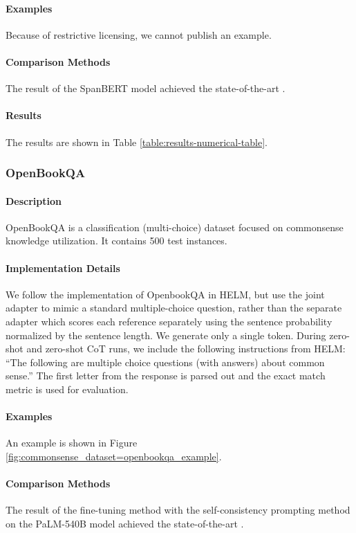 \paragraph{Examples} Because of restrictive licensing, we cannot publish an example.

\paragraph{Comparison Methods}
The result of the SpanBERT model achieved the state-of-the-art \citep{joshi2020spanbert}.

\paragraph{Results} The results are shown in Table \ref{table:results-numerical-table}.

\subsubsection{OpenBookQA}
\paragraph{Description} OpenBookQA \citep{Mihaylov2018CanAS} is a classification (multi-choice) dataset focused on commonsense knowledge utilization. It contains 500 test instances.

\paragraph{Implementation Details}
We follow the implementation of OpenbookQA in HELM, but use the joint adapter to mimic a standard multiple-choice question, rather than the separate adapter which scores each reference separately using the sentence probability normalized by the sentence length. We generate only a single token. During zero-shot and zero-shot CoT runs, we include the following instructions from HELM: ``The following are multiple choice questions (with answers) about common sense.'' The first letter from the response is parsed out and the exact match metric is used for evaluation.

\paragraph{Examples} An example is shown in Figure \ref{fig:commonsense_dataset=openbookqa_example}.

\paragraph{Comparison Methods}
The result of the fine-tuning method with the self-consistency prompting method on the PaLM-540B model achieved the state-of-the-art \citep{huang2022large}.

